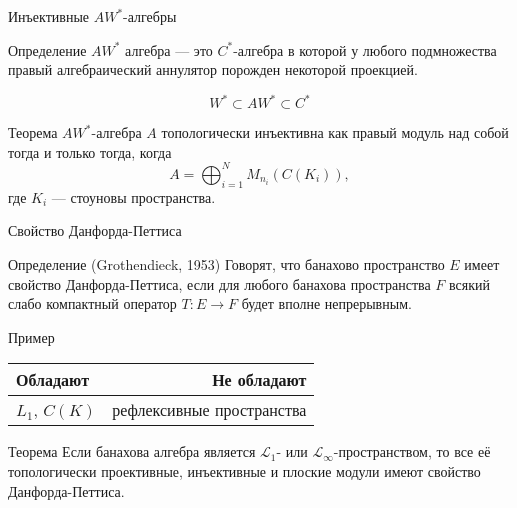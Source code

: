 \documentclass[9pt,pdf,utf8,russian]{beamer}
\begin{document}
\begin{frame}{Инъективные $AW^*$-алгебры}
    \begin{block}{Определение}
        $AW^*$ алгебра --- это $C^*$-алгебра в которой у любого подмножества
        правый алгебраический аннулятор порожден некоторой проекцией.
    \end{block}
    \pause
    \[
        W^*\subset AW^*\subset C^*
    \]
    \pause
    \begin{alertblock}{Теорема}
        $AW^*$-алгебра $A$ топологически инъективна как правый модуль над
        собой тогда и только тогда, когда
        \[
            A=\bigoplus_{i=1}^N M_{n_i}(C(K_i)),
        \]
        где $K_i$ --- стоуновы пространства.
    \end{alertblock}
\end{frame}

\begin{frame}{Свойство Данфорда-Петтиса}
    \begin{block}{Определение (Grothendieck, 1953)}
        Говорят, что банахово пространство $E$ имеет свойство Данфорда-Петтиса,
        если для любого банахова пространства $F$
        всякий слабо компактный оператор $T:E\to F$ будет вполне непрерывным.
    \end{block}
    \pause
    \begin{exampleblock}{Пример}
        \begin{table}
            \begin{tabular}{lr}
                Обладают      & Не обладают               \\
                \midrule
                $L_1$, $C(K)$ & рефлексивные пространства \\
            \end{tabular}
        \end{table}
    \end{exampleblock}
    \pause
    \begin{alertblock}{Теорема}
        Если банахова алгебра является $\mathscr{L}_1$- или
        $\mathscr{L}_\infty$-пространством,
        то все её топологически проективные, инъективные и плоские модули
        имеют свойство Данфорда-Петтиса.
    \end{alertblock}
\end{frame}
\end{document}
